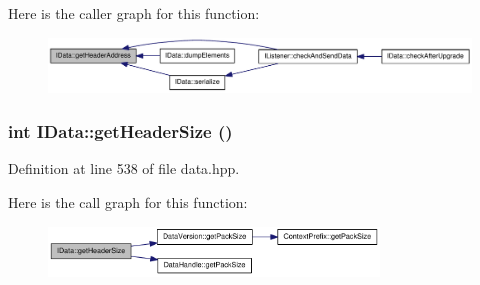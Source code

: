 Here is the caller graph for this function:\nopagebreak
\begin{figure}[H]
\begin{center}
\leavevmode
\includegraphics[width=336pt]{class_i_data_aa47c48488508421dfab3f8b2c226401e_icgraph}
\end{center}
\end{figure}
\hypertarget{class_i_data_acf62b5fb26cf38c5a0b1480f8a548664}{
\subsubsection[{getHeaderSize}]{\setlength{\rightskip}{0pt plus 5cm}int IData::getHeaderSize ()}}
\label{class_i_data_acf62b5fb26cf38c5a0b1480f8a548664}


Definition at line 538 of file data.hpp.

Here is the call graph for this function:\nopagebreak
\begin{figure}[H]
\begin{center}
\leavevmode
\includegraphics[width=249pt]{class_i_data_acf62b5fb26cf38c5a0b1480f8a548664_cgraph}
\end{center}
\end{figure}



